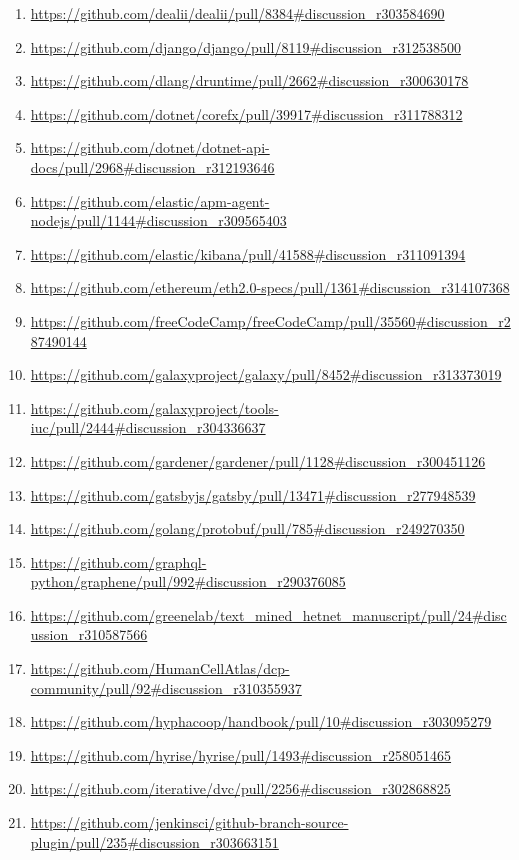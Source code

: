 {\begin{enumerate}[topsep=0pt,itemsep=-1ex,partopsep=1ex,parsep=1ex]
    \item \url{https://github.com/dealii/dealii/pull/8384\#discussion_r303584690}
    \item \url{https://github.com/django/django/pull/8119\#discussion_r312538500}
    \item \url{https://github.com/dlang/druntime/pull/2662\#discussion_r300630178}
    \item \url{https://github.com/dotnet/corefx/pull/39917\#discussion_r311788312}
    \item \url{https://github.com/dotnet/dotnet-api-docs/pull/2968\#discussion_r312193646}
    \item \url{https://github.com/elastic/apm-agent-nodejs/pull/1144\#discussion_r309565403}
    \item \url{https://github.com/elastic/kibana/pull/41588\#discussion_r311091394}
    \item \url{https://github.com/ethereum/eth2.0-specs/pull/1361\#discussion_r314107368}
    \item \url{https://github.com/freeCodeCamp/freeCodeCamp/pull/35560\#discussion_r287490144}
    \item \url{https://github.com/galaxyproject/galaxy/pull/8452\#discussion_r313373019}
    \item \url{https://github.com/galaxyproject/tools-iuc/pull/2444\#discussion_r304336637}
    \item \url{https://github.com/gardener/gardener/pull/1128\#discussion_r300451126}
    \item \url{https://github.com/gatsbyjs/gatsby/pull/13471\#discussion_r277948539}
    \item \url{https://github.com/golang/protobuf/pull/785\#discussion_r249270350}
    \item \url{https://github.com/graphql-python/graphene/pull/992\#discussion_r290376085}
    \item \url{https://github.com/greenelab/text_mined_hetnet_manuscript/pull/24\#discussion_r310587566}
    \item \url{https://github.com/HumanCellAtlas/dcp-community/pull/92\#discussion_r310355937}
    \item \url{https://github.com/hyphacoop/handbook/pull/10\#discussion_r303095279}
    \item \url{https://github.com/hyrise/hyrise/pull/1493\#discussion_r258051465}
    \item \url{https://github.com/iterative/dvc/pull/2256\#discussion_r302868825}
    \item \url{https://github.com/jenkinsci/github-branch-source-plugin/pull/235\#discussion_r303663151}

\end{enumerate}}
